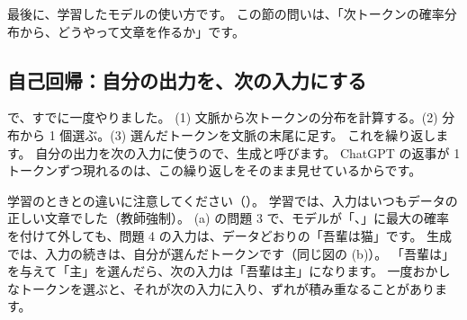 最後に、学習したモデルの使い方です。
この節の問いは、「次トークンの確率分布から、どうやって文章を作るか」です。

\subsection*{自己回帰：自分の出力を、次の入力にする}

で、すでに一度やりました。
(1) 文脈から次トークンの分布を計算する。(2) 分布から 1 個選ぶ。(3) 選んだトークンを文脈の末尾に足す。
これを繰り返します。
自分の出力を次の入力に使うので、生成と呼びます。
ChatGPT の返事が 1 トークンずつ現れるのは、この繰り返しをそのまま見せているからです。

学習のときとの違いに注意してください（）。
学習では、入力はいつもデータの正しい文章でした（教師強制）。
(a) の問題 3 で、モデルが「、」に最大の確率を付けて外しても、問題 4 の入力は、データどおりの「吾輩は猫」です。
生成では、入力の続きは、自分が選んだトークンです（同じ図の (b)）。
「吾輩は」を与えて「主」を選んだら、次の入力は「吾輩は主」になります。
一度おかしなトークンを選ぶと、それが次の入力に入り、ずれが積み重なることがあります。

